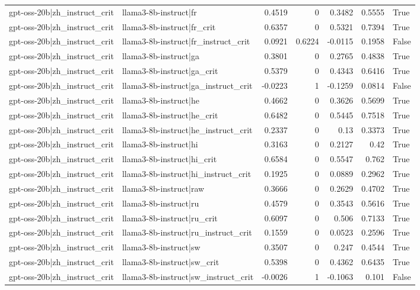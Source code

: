 \begin{table}
\begin{tabular}{l l r r r r l}
gpt-oss-20b|zh_instruct_crit & llama3-8b-instruct|fr & 0.4519 & 0 & 0.3482 & 0.5555 & True \\
gpt-oss-20b|zh_instruct_crit & llama3-8b-instruct|fr_crit & 0.6357 & 0 & 0.5321 & 0.7394 & True \\
gpt-oss-20b|zh_instruct_crit & llama3-8b-instruct|fr_instruct_crit & 0.0921 & 0.6224 & -0.0115 & 0.1958 & False \\
gpt-oss-20b|zh_instruct_crit & llama3-8b-instruct|ga & 0.3801 & 0 & 0.2765 & 0.4838 & True \\
gpt-oss-20b|zh_instruct_crit & llama3-8b-instruct|ga_crit & 0.5379 & 0 & 0.4343 & 0.6416 & True \\
gpt-oss-20b|zh_instruct_crit & llama3-8b-instruct|ga_instruct_crit & -0.0223 & 1 & -0.1259 & 0.0814 & False \\
gpt-oss-20b|zh_instruct_crit & llama3-8b-instruct|he & 0.4662 & 0 & 0.3626 & 0.5699 & True \\
gpt-oss-20b|zh_instruct_crit & llama3-8b-instruct|he_crit & 0.6482 & 0 & 0.5445 & 0.7518 & True \\
gpt-oss-20b|zh_instruct_crit & llama3-8b-instruct|he_instruct_crit & 0.2337 & 0 & 0.13 & 0.3373 & True \\
gpt-oss-20b|zh_instruct_crit & llama3-8b-instruct|hi & 0.3163 & 0 & 0.2127 & 0.42 & True \\
gpt-oss-20b|zh_instruct_crit & llama3-8b-instruct|hi_crit & 0.6584 & 0 & 0.5547 & 0.762 & True \\
gpt-oss-20b|zh_instruct_crit & llama3-8b-instruct|hi_instruct_crit & 0.1925 & 0 & 0.0889 & 0.2962 & True \\
gpt-oss-20b|zh_instruct_crit & llama3-8b-instruct|raw & 0.3666 & 0 & 0.2629 & 0.4702 & True \\
gpt-oss-20b|zh_instruct_crit & llama3-8b-instruct|ru & 0.4579 & 0 & 0.3543 & 0.5616 & True \\
gpt-oss-20b|zh_instruct_crit & llama3-8b-instruct|ru_crit & 0.6097 & 0 & 0.506 & 0.7133 & True \\
gpt-oss-20b|zh_instruct_crit & llama3-8b-instruct|ru_instruct_crit & 0.1559 & 0 & 0.0523 & 0.2596 & True \\
gpt-oss-20b|zh_instruct_crit & llama3-8b-instruct|sw & 0.3507 & 0 & 0.247 & 0.4544 & True \\
gpt-oss-20b|zh_instruct_crit & llama3-8b-instruct|sw_crit & 0.5398 & 0 & 0.4362 & 0.6435 & True \\
gpt-oss-20b|zh_instruct_crit & llama3-8b-instruct|sw_instruct_crit & -0.0026 & 1 & -0.1063 & 0.101 & False \\

\end{tabular}
\end{table}
